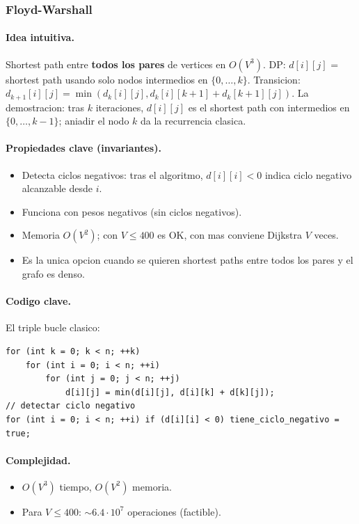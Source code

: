 ﻿\subsubsection{Floyd-Warshall}

\paragraph{Idea intuitiva.}
Shortest path entre \textbf{todos los pares} de vertices en $O(V^3)$. DP: $d[i][j]$ = shortest path usando solo nodos intermedios en $\{0, \dots, k\}$. Transicion: $d_{k+1}[i][j] = \min(d_k[i][j], d_k[i][k+1] + d_k[k+1][j])$. La demostracion: tras $k$ iteraciones, $d[i][j]$ es el shortest path con intermedios en $\{0, \dots, k-1\}$; aniadir el nodo $k$ da la recurrencia clasica.

\paragraph{Propiedades clave (invariantes).}
\begin{itemize}\setlength\itemsep{0pt}
	\item Detecta ciclos negativos: tras el algoritmo, $d[i][i] < 0$ indica ciclo negativo alcanzable desde $i$.
	\item Funciona con pesos negativos (sin ciclos negativos).
	\item Memoria $O(V^2)$; con $V \le 400$ es OK, con mas conviene Dijkstra $V$ veces.
	\item Es la unica opcion cuando se quieren shortest paths entre todos los pares y el grafo es denso.
\end{itemize}

\paragraph{Codigo clave.}
El triple bucle clasico:
\begin{verbatim}
for (int k = 0; k < n; ++k)
    for (int i = 0; i < n; ++i)
        for (int j = 0; j < n; ++j)
            d[i][j] = min(d[i][j], d[i][k] + d[k][j]);
// detectar ciclo negativo
for (int i = 0; i < n; ++i) if (d[i][i] < 0) tiene_ciclo_negativo = true;
\end{verbatim}

\paragraph{Complejidad.}
\begin{itemize}\setlength\itemsep{0pt}
	\item $O(V^3)$ tiempo, $O(V^2)$ memoria.
	\item Para $V \le 400$: $\sim 6.4 \cdot 10^7$ operaciones (factible).
\end{itemize}

